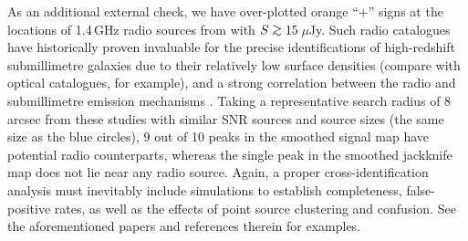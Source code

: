 \documentclass[useAMS,usenatbib,nofootinbib]{mn2e}
\def\gsim{\mathrel{\lower2.5pt\vbox{\lineskip=0pt\baselineskip=0pt
          \hbox{$>$}\hbox{$\sim$}}}}
\begin{document}
As an additional external check, we have over-plotted orange ``$+$''
signs at the locations of 1.4\,GHz radio sources from \citet{owen2008}
with $S\gsim15$\,$\mu$Jy. Such radio catalogues have historically
proven invaluable for the precise identifications of high-redshift
submillimetre galaxies due to their relatively low surface densities
(compare with optical catalogues, for example), and a strong
correlation between the radio and submillimetre emission mechanisms
\citep[e.g.][]{smail2000,pope2006,ivison2007,chapin2009b}. Taking a
representative search radius of 8\,arcsec from these studies with
similar SNR sources and source sizes (the same size as the blue
circles), 9 out of 10 peaks in the smoothed signal map have potential
radio counterparts, whereas the single peak in the smoothed jackknife
map does not lie near any radio source. Again, a proper
cross-identification analysis must inevitably include simulations to
establish completeness, false-positive rates, as well as the effects
of point source clustering and confusion. See the aforementioned
papers and references therein for examples.
\end{document}
